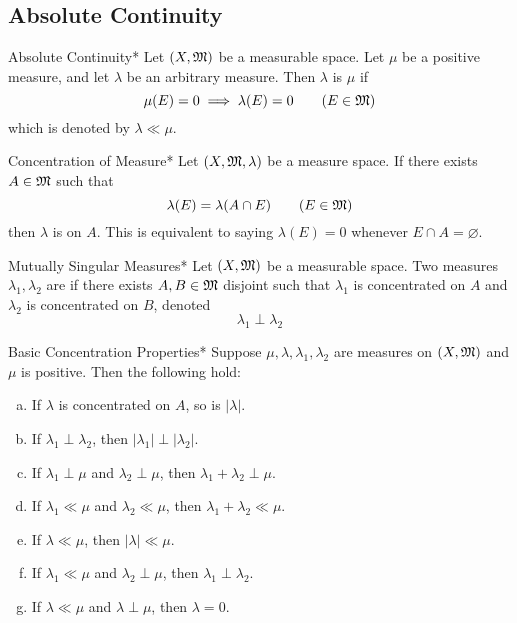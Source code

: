 \subsection{Absolute Continuity}

\begin{definition}{Absolute Continuity}*
    Let \((X, \mathfrak{M})\) be a measurable space. Let \(\mu\) be a positive measure, and let \(\lambda\) be an arbitrary measure. Then \(\lambda\) is  \(\mu\) if 
    \[
        \mu(E) = 0 \implies \lambda(E) = 0
        \qquad (E \in \mathfrak{M})
    \]
    which is denoted by \(\lambda \ll \mu\). 
\end{definition}

\begin{definition}{Concentration of Measure}*
    Let \((X, \mathfrak{M}, \lambda)\) be a measure space. If there exists \(A \in \mathfrak{M}\) such that
    \[
        \lambda(E) = \lambda(A \cap E)
        \qquad (E \in \mathfrak{M})
    \]
    then \(\lambda\) is  on \(A\). This is equivalent to saying \(\lambda(E) = 0\) whenever \(E \cap A = \varnothing\).
\end{definition}

\begin{definition}{Mutually Singular Measures}*
    Let \((X, \mathfrak{M})\) be a measurable space. Two measures \(\lambda_1, \lambda_2\) are  if there exists \(A, B \in \mathfrak{M}\) disjoint such that \(\lambda_1\) is concentrated on \(A\) and \(\lambda_2\) is concentrated on \(B\), denoted
    \[
        \lambda_1 \perp \lambda_2
    \]
\end{definition}

\begin{proposition}{Basic Concentration Properties}*
    Suppose \(\mu, \lambda, \lambda_1, \lambda_2\) are measures on \((X, \mathfrak{M})\) and \(\mu\) is positive. Then the following hold:
    \begin{enumerate}[(a)]
        \itemsep0em
        \item If \(\lambda\) is concentrated on \(A\), so is \(|\lambda|\). 
        \item If \(\lambda_1 \perp \lambda_2\), then \(|\lambda_1| \perp |\lambda_2|\). 
        \item If \(\lambda_1 \perp \mu\) and \(\lambda_2 \perp \mu\), then \(\lambda_1 + \lambda_2 \perp \mu\).
        \item If \(\lambda_1 \ll \mu\) and \(\lambda_2 \ll \mu\), then \(\lambda_1 + \lambda_2 \ll \mu\).
        \item If \(\lambda \ll \mu\), then \(|\lambda| \ll \mu\).
        \item If \(\lambda_1 \ll \mu\) and \(\lambda_2 \perp \mu\), then \(\lambda_1 \perp \lambda_2\). 
        \item If \(\lambda \ll \mu\) and \(\lambda \perp \mu\), then \(\lambda = 0\). 
    \end{enumerate}
\end{proposition}

